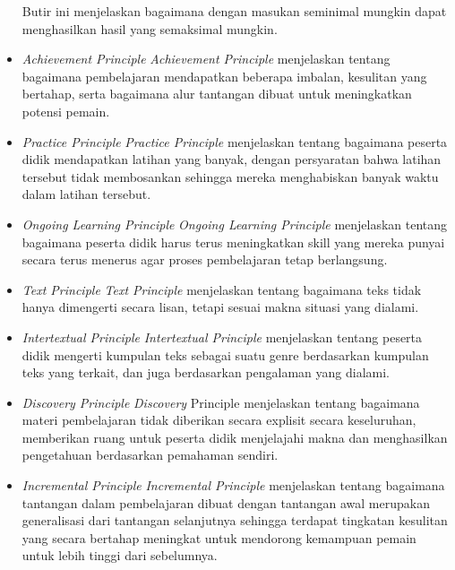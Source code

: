 \begin{itemize}
			\subitem Butir ini menjelaskan bagaimana dengan masukan seminimal mungkin dapat menghasilkan hasil yang semaksimal mungkin.
		\item \textit{Achievement Principle}
			\subitem \textit{Achievement Principle} menjelaskan tentang bagaimana pembelajaran mendapatkan beberapa imbalan, kesulitan yang bertahap, serta bagaimana alur tantangan  dibuat untuk meningkatkan potensi pemain.
		\item \textit{Practice Principle}
			\subitem \textit{Practice Principle} menjelaskan tentang bagaimana peserta didik mendapatkan latihan yang banyak, dengan persyaratan bahwa latihan tersebut tidak membosankan sehingga mereka menghabiskan banyak waktu dalam latihan tersebut.
		\item \textit{Ongoing Learning Principle}
			\subitem \textit{Ongoing Learning Principle} menjelaskan tentang bagaimana peserta didik harus terus meningkatkan skill yang mereka punyai secara terus menerus agar proses pembelajaran tetap berlangsung.
		\item \textit{Text Principle}
			\subitem \textit{Text Principle} menjelaskan tentang bagaimana teks tidak hanya dimengerti secara lisan, tetapi sesuai makna situasi yang dialami.
		\item \textit{Intertextual Principle}
			\subitem \textit{Intertextual Principle} menjelaskan tentang peserta didik mengerti kumpulan teks sebagai suatu genre berdasarkan kumpulan teks yang terkait, dan juga berdasarkan pengalaman yang dialami.
		\item \textit{Discovery Principle}
			\subitem \textit{Discovery} Principle menjelaskan tentang bagaimana materi pembelajaran tidak diberikan secara explisit secara keseluruhan, memberikan ruang untuk peserta didik menjelajahi makna dan menghasilkan pengetahuan berdasarkan pemahaman sendiri.
		\item \textit{Incremental Principle}
			\subitem \textit{Incremental Principle} menjelaskan tentang bagaimana tantangan dalam pembelajaran dibuat dengan tantangan awal merupakan generalisasi dari tantangan selanjutnya sehingga terdapat tingkatan kesulitan yang secara bertahap meningkat untuk mendorong kemampuan pemain untuk lebih tinggi dari sebelumnya.
		
	\end{itemize}

